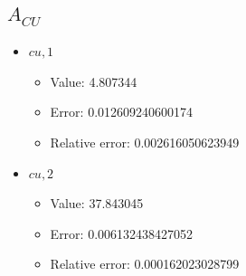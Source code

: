 \documentclass{article}%
\begin{document}
\subsection{$A_{CU}$}%
\begin{itemize}%
	\item $\textit{cu},1$%
	\begin{itemize}%
		\item Value: 4.807344%
		\item Error: 0.012609240600174%
		\item Relative error: 0.002616050623949%
	\end{itemize}%
	\item $\textit{cu},2$%
	\begin{itemize}%
		\item Value: 37.843045%
		\item Error: 0.006132438427052%
		\item Relative error: 0.000162023028799%
	\end{itemize}%
\end{itemize}%
\end{document}
